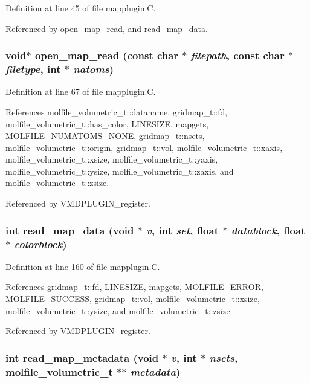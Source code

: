 Definition at line 45 of file mapplugin.C.

Referenced by open\_\-map\_\-read, and read\_\-map\_\-data.
\subsubsection{\setlength{\rightskip}{0pt plus 5cm}void$\ast$ open\_\-map\_\-read (const char $\ast$ {\em filepath}, const char $\ast$ {\em filetype}, int $\ast$ {\em natoms})\hspace{0.3cm}{\tt  [static]}}\label{mapplugin_8C_a3}




Definition at line 67 of file mapplugin.C.

References molfile\_\-volumetric\_\-t::dataname, gridmap\_\-t::fd, molfile\_\-volumetric\_\-t::has\_\-color, LINESIZE, mapgets, MOLFILE\_\-NUMATOMS\_\-NONE, gridmap\_\-t::nsets, molfile\_\-volumetric\_\-t::origin, gridmap\_\-t::vol, molfile\_\-volumetric\_\-t::xaxis, molfile\_\-volumetric\_\-t::xsize, molfile\_\-volumetric\_\-t::yaxis, molfile\_\-volumetric\_\-t::ysize, molfile\_\-volumetric\_\-t::zaxis, and molfile\_\-volumetric\_\-t::zsize.

Referenced by VMDPLUGIN\_\-register.
\subsubsection{\setlength{\rightskip}{0pt plus 5cm}int read\_\-map\_\-data (void $\ast$ {\em v}, int {\em set}, float $\ast$ {\em datablock}, float $\ast$ {\em colorblock})\hspace{0.3cm}{\tt  [static]}}\label{mapplugin_8C_a5}




Definition at line 160 of file mapplugin.C.

References gridmap\_\-t::fd, LINESIZE, mapgets, MOLFILE\_\-ERROR, MOLFILE\_\-SUCCESS, gridmap\_\-t::vol, molfile\_\-volumetric\_\-t::xsize, molfile\_\-volumetric\_\-t::ysize, and molfile\_\-volumetric\_\-t::zsize.

Referenced by VMDPLUGIN\_\-register.
\subsubsection{\setlength{\rightskip}{0pt plus 5cm}int read\_\-map\_\-metadata (void $\ast$ {\em v}, int $\ast$ {\em nsets}, {\bf molfile\_\-volumetric\_\-t} $\ast$$\ast$ {\em metadata})\hspace{0.3cm}{\tt  [static]}}\label{mapplugin_8C_a4}





